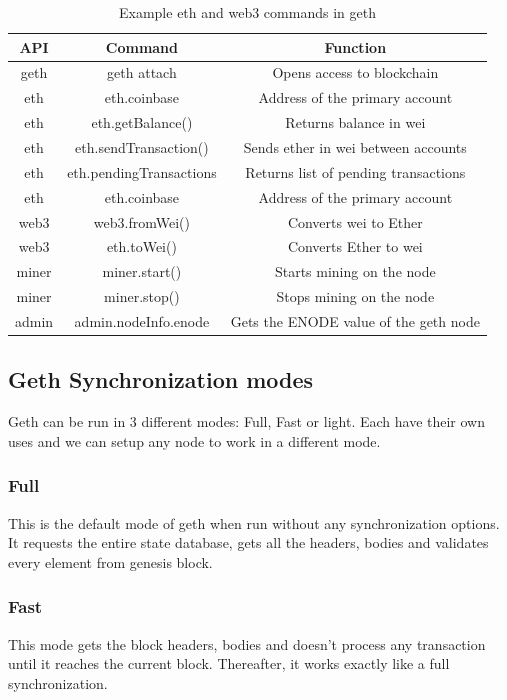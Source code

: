 \documentclass[11pt,openright]{report}
\begin{document}
\begin{table}[!htbp]
	\renewcommand{\arraystretch}{1.3}
	\caption{Example eth and web3 commands in geth}
	\label{geth_commands}
	\centering
	\begin{tabular}{|c|c|c|}
		\hline
		\bfseries API & \bfseries Command & \bfseries Function \\
		\hline\hline
		geth & geth attach & Opens access to blockchain \\ \hline
		eth & eth.coinbase & Address of the primary account \\ \hline
		eth & eth.getBalance() & Returns balance in wei \\ \hline
        eth & eth.sendTransaction() & Sends ether in wei between accounts \\ \hline
        eth & eth.pendingTransactions & Returns list of pending transactions\\ \hline
        eth & eth.coinbase & Address of the primary account \\ \hline
        web3 & web3.fromWei() & Converts wei to Ether \\ \hline
        web3 & eth.toWei() & Converts Ether to wei \\ \hline
        miner & miner.start() & Starts mining on the node \\ \hline
        miner & miner.stop() & Stops mining on the node \\ \hline
        admin & admin.nodeInfo.enode & Gets the ENODE value of the geth node \\ \hline
	\end{tabular}
\end{table}

\newpage
\subsection{Geth Synchronization modes}
Geth can be run in 3 different modes: Full, Fast or light. Each have their own uses and we can setup any node to work in a different mode. 

\subsubsection{Full} 
This is the default mode of geth when run without any synchronization options. It requests the entire state database, gets all the headers, bodies and validates every element from genesis block.

\subsubsection{Fast}
This mode gets the block headers, bodies and doesn't process any transaction until it reaches the current block. Thereafter, it works exactly like a full synchronization.
\end{document}
